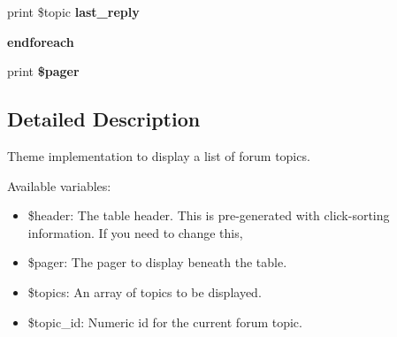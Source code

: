 \begin{CompactItemize}
\item 
\hypertarget{forum-topic-list_8tpl_8php_146df04f10b09ef6f4f986b0ab1dafde}{
print \$topic \textbf{last\_\-reply}}
\label{forum-topic-list_8tpl_8php_146df04f10b09ef6f4f986b0ab1dafde}

\item 
\hypertarget{forum-topic-list_8tpl_8php_672d9707ef91db026c210f98cc601123}{
\textbf{endforeach}}
\label{forum-topic-list_8tpl_8php_672d9707ef91db026c210f98cc601123}

\item 
\hypertarget{forum-topic-list_8tpl_8php_832d48720a0d8c51e6a14792173c3a61}{
print \textbf{\$pager}}
\label{forum-topic-list_8tpl_8php_832d48720a0d8c51e6a14792173c3a61}

\end{CompactItemize}


\subsection{Detailed Description}
Theme implementation to display a list of forum topics.

Available variables:\begin{itemize}
\item \$header: The table header. This is pre-generated with click-sorting information. If you need to change this, 
\item \$pager: The pager to display beneath the table.\item \$topics: An array of topics to be displayed.\item \$topic\_\-id: Numeric id for the current forum topic.\end{itemize}


